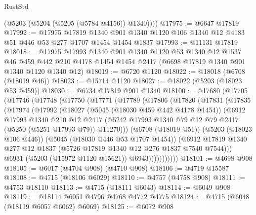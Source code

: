 \begin{lexlean}{RustStd}
\begin{coremodule}
        (@5203 (@5204 (@5205 (@5784 @4156)) @1340))))
@17975 := @6647 @17819
@17992 := @17975
    @17819
    @1340
    @901
    @1340
    @1120
    @106
    @1340
    @12
    @4183
    @51
    @446
    @53
    @277
    @1707
    @1454
    @1454
    @1837
@17993 := @11131 @17819
@18018 := @17975
    @17993
    @1340
    @901
    @1340
    @1120
    @53
    @1340
    @12
    @1537
    @46
    @459
    @442
    @210
    @4178
    @1454
    @1454
    @2417
    (@6698 @17819 @1340 @901 @1340 @1120 @1340 @12)
@18019 := @6720 @1120
@18022 := @18018 (@6708 (@18019 @46))
@18023 := @15714 @1120
@18027 := @18022 (@5203 (@18023 @53 @459))
@18030 := @6734 @17819 @901 @1340
@18100 := @17680
    (@17705
      (@17746
        (@17748
          (@17750
            (@17771
              (@17789
                (@17806
                  (@17820
                    (@17831
                      (@17835
                        (@17974
                          (@17992
                            (@18027
                              (@5045 (@18030 @459 @442 @4178 @1454))
                              (@6912
                                @17993
                                @1340
                                @210
                                @12
                                @2417
                                (@5242
                                  @17993
                                  @1340
                                  @79
                                  @12
                                  @79
                                  @2417
                                  (@5250 (@5251 @17993 @79))
                                  @11270)))
                            (@6708 (@18019 @51))
                            (@5203 (@18023 @106 @446))
                            (@5045 (@18030 @446 @53 @1707 @1454))
                            (@6912
                              @17819
                              @1340
                              @277
                              @12
                              @1837
                              (@5726 @17819 @1340 @12 @276 @1837 @7540 @7544)))
                          @6931
                          (@5203 (@15972 @1120 @15621))
                          @6943)))))))))))
@18101 := @4698 @908
@18105 := @6017 (@4704 @908) (@4710 @908)
@18106 := @4719 @15587
@18108 := @4715 (@18106 @6029)
@18110 := @4757 (@4758 @908)
@18111 := @4753 @18110
@18113 := @4715 (@18111 @6043)
@18114 := @6049 @908
@18119 := @18114 @6051 @4796 @4768 @4772 @4775
@18124 := @4715 (@6048 (@18119 @6057 @6062) @6069)
@18125 := @6072 @908

\end{coremodule}
\end{lexlean}
